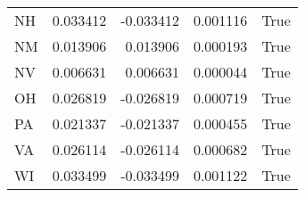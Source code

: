 \begin{table}
\begin{tabular}{lrrrl}
      NH &   0.033412 & -0.033412 &       0.001116 &          True \\
      NM &   0.013906 &  0.013906 &       0.000193 &          True \\
      NV &   0.006631 &  0.006631 &       0.000044 &          True \\
      OH &   0.026819 & -0.026819 &       0.000719 &          True \\
      PA &   0.021337 & -0.021337 &       0.000455 &          True \\
      VA &   0.026114 & -0.026114 &       0.000682 &          True \\
      WI &   0.033499 & -0.033499 &       0.001122 &          True \\
\bottomrule
\end{tabular}
\end{table}
